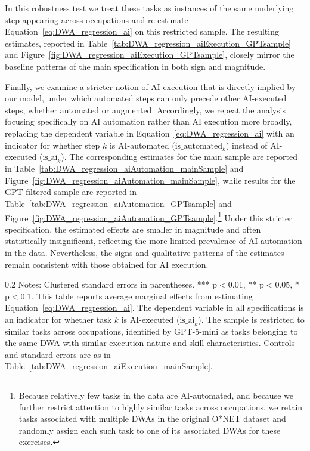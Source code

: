 In this robustness test we treat these tasks as instances of the same underlying step appearing across occupations and re-estimate Equation~\eqref{eq:DWA_regression_ai} on this restricted sample.
The resulting estimates, reported in Table~\ref{tab:DWA_regression_aiExecution_GPTsample} and Figure~\ref{fig:DWA_regression_aiExecution_GPTsample}, closely mirror the baseline patterns of the main specification in both sign and magnitude.

Finally, we examine a stricter notion of AI execution that is directly implied by our model, under which automated steps can only precede other AI-executed steps, whether automated or augmented.
Accordingly, we repeat the analysis focusing specifically on AI automation rather than AI execution more broadly, replacing the dependent variable in Equation~\eqref{eq:DWA_regression_ai} with an indicator for whether step $k$ is AI-automated ($\text{is\_automated}_{k}$) instead of AI-executed ($\text{is\_ai}_{k}$).
The corresponding estimates for the main sample are reported in Table~\ref{tab:DWA_regression_aiAutomation_mainSample} and Figure~\ref{fig:DWA_regression_aiAutomation_mainSample}, while results for the GPT-filtered sample are reported in Table~\ref{tab:DWA_regression_aiAutomation_GPTsample} and Figure~\ref{fig:DWA_regression_aiAutomation_GPTsample}.\footnote{
Because relatively few tasks in the data are AI-automated, and because we further restrict attention to highly similar tasks across occupations, we retain tasks associated with multiple DWAs in the original O*NET dataset and randomly assign each such task to one of its associated DWAs for these exercises.
}
Under this stricter specification, the estimated effects are smaller in magnitude and often statistically insignificant, reflecting the more limited prevalence of AI automation in the data. Nevertheless, the signs and qualitative patterns of the estimates remain consistent with those obtained for AI execution.


\begin{table}[!t]
\centering
\caption{Effect of Neighboring Tasks' AI Execution Status on Task's AI Execution Likelihood (GPT-filtered Sample)}
\label{tab:DWA_regression_aiExecution_GPTsample}
    \footnotesize
\resizebox{\textwidth}{!}{

}
\begin{minipage}{1\linewidth}
\begin{spacing}{0.2}
{\fontsize{9.5pt}{10pt}\selectfont Notes: Clustered standard errors in parentheses. *** p$<$0.01, ** p$<$0.05, * p$<$0.1.
This table reports average marginal effects from estimating Equation~\eqref{eq:DWA_regression_ai}.
The dependent variable in all specifications is an indicator for whether task $k$ is AI-executed ($\text{is\_ai}_{k}$).
The sample is restricted to similar tasks across occupations, identified by GPT-5-mini as tasks belonging to the same DWA with similar execution nature and skill characteristics.
Controls and standard errors are as in Table~\ref{tab:DWA_regression_aiExecution_mainSample}.}
\end{spacing}
\end{minipage}\end{table}

